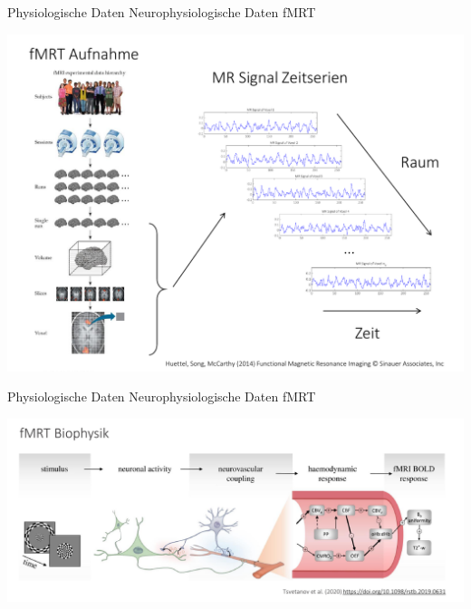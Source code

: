 \documentclass[
  8pt,
  ignorenonframetext,
]{beamer}
\begin{document}
\begin{frame}{Physiologische Daten}
\protect\hypertarget{physiologische-daten-8}{}
Neurophysiologische Daten \textbar{} fMRT \vspace{1mm}

\begin{center}\includegraphics[width=0.8\linewidth]{3_Abbildungen/pfm_3_fmrt_aufnahme} \end{center}
\end{frame}

\begin{frame}{Physiologische Daten}
\protect\hypertarget{physiologische-daten-9}{}
Neurophysiologische Daten \textbar{} fMRT \vspace{3mm}

\begin{center}\includegraphics[width=0.9\linewidth]{3_Abbildungen/pfm_3_fmrt_biophysik} \end{center}
\end{frame}
\end{document}
